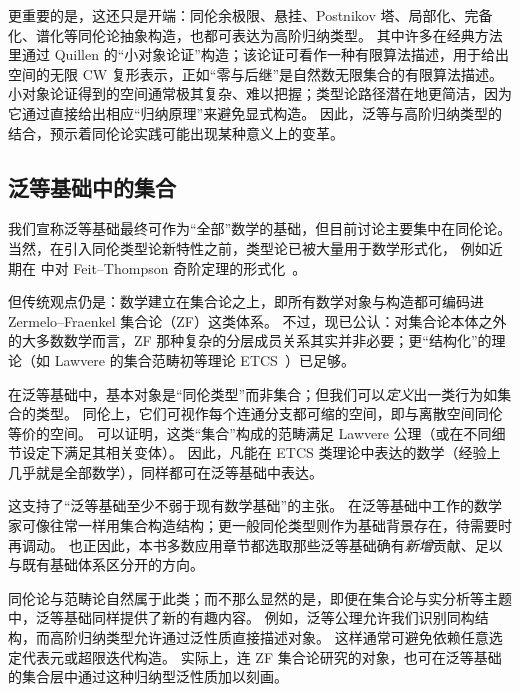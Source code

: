更重要的是，这还只是开端：同伦余极限、悬挂、Postnikov 塔、局部化、完备化、谱化等同伦论抽象构造，也都可表达为高阶归纳类型。
其中许多在经典方法里通过 Quillen 的“小对象论证”构造；该论证可看作一种有限算法描述，用于给出空间的无限 CW 复形表示，正如“零与后继”是自然数无限集合的有限算法描述。
小对象论证得到的空间通常极其复杂、难以把握；类型论路径潜在地更简洁，因为它通过直接给出相应“归纳原理”来避免显式构造。
因此，泛等与高阶归纳类型的结合，预示着同伦论实践可能出现某种意义上的变革。


\subsection*{泛等基础中的集合}

%

我们宣称泛等基础最终可作为“全部”数学的基础，但目前讨论主要集中在同伦论。
当然，在引入同伦类型论新特性之前，类型论已被大量用于数学形式化，
%
%
%
%
%
例如近期在 \Coq 中对 Feit--Thompson 奇阶定理的形式化~\cite{gonthier}。

但传统观点仍是：数学建立在集合论之上，即所有数学对象与构造都可编码进 Zermelo--Fraenkel 集合论（ZF）这类体系。
%
%
%
%
不过，现已公认：对集合论本体之外的大多数数学而言，ZF 那种复杂的分层成员关系其实并非必要；更“结构化”的理论（如 Lawvere 的集合范畴初等理论 ETCS~\cite{lawvere:etcs-long}）已足够。
%

在泛等基础中，基本对象是“同伦类型”而非集合；但我们可以\emph{定义}出一类行为如集合的类型。
同伦上，它们可视作每个连通分支都可缩的空间，即与离散空间同伦等价的空间。
%
可以证明，这类“集合”构成的范畴满足 Lawvere 公理（或在不同细节设定下满足其相关变体）。
因此，凡能在 ETCS 类理论中表达的数学（经验上几乎就是全部数学），同样都可在泛等基础中表达。

这支持了“泛等基础至少不弱于现有数学基础”的主张。
在泛等基础中工作的数学家可像往常一样用集合构造结构；更一般同伦类型则作为基础背景存在，待需要时再调动。
也正因此，本书多数应用章节都选取那些泛等基础确有\emph{新增}贡献、足以与既有基础体系区分开的方向。

同伦论与范畴论自然属于此类；而不那么显然的是，即便在集合论与实分析等主题中，泛等基础同样提供了新的有趣内容。
例如，泛等公理允许我们识别同构结构，而高阶归纳类型允许通过泛性质直接描述对象。
这样通常可避免依赖任意选定代表元或超限迭代构造。
实际上，连 ZF 集合论研究的对象，也可在泛等基础的集合层中通过这种归纳型泛性质加以刻画。

